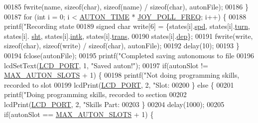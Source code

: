 \begin{DoxyCode}
{{{{{{{{{{{{{{{{{00185         fwrite(name, \textcolor{keyword}{sizeof}(\textcolor{keywordtype}{char}), \textcolor{keyword}{sizeof}(name) / \textcolor{keyword}{sizeof}(\textcolor{keywordtype}{char}), autonFile);
00186     \}
00187     \textcolor{keywordflow}{for} (\textcolor{keywordtype}{int} i = 0; i < \hyperlink{autonrecorder_8h_aa19f7c427989a0a67f55958c610d0355}{AUTON\_TIME} * \hyperlink{autonrecorder_8h_a3d2260a30e7ce727bef0402edee4b205}{JOY\_POLL\_FREQ}; i++) \{
00188         printf(\textcolor{stringliteral}{"Recording state %
00189         \textcolor{keywordtype}{signed} \textcolor{keywordtype}{char} write[6] = \{states[i].\hyperlink{structjoy_state_a7867156ddb5bc22d57010c5af00c98af}{spd}, states[i].\hyperlink{structjoy_state_aacdbb758b97190220423402f63020483}{turn}, states[i].
      \hyperlink{structjoy_state_a751363be4e40b27bcbe558f41a15fe91}{sht}, states[i].\hyperlink{structjoy_state_a2314ed43be31ccc565381efd8398b921}{intk}, states[i].\hyperlink{structjoy_state_acc4f7bae078e8c8b7840cda61382c7cf}{trans},
00190                                 states[i].\hyperlink{structjoy_state_a3ba5ee3c4eec0e2ee03338b397a17958}{dep}\};
00191         fwrite(write, \textcolor{keyword}{sizeof}(\textcolor{keywordtype}{char}), \textcolor{keyword}{sizeof}(write) / \textcolor{keyword}{sizeof}(\textcolor{keywordtype}{char}), autonFile);
00192         delay(10);
00193     \}
00194     fclose(autonFile);
00195     printf(\textcolor{stringliteral}{"Completed saving autonomous to file %
00196     lcdSetText(\hyperlink{lcdmsg_8h_abcf42bd88b3c36193f301ca25b033875}{LCD\_PORT}, 1, \textcolor{stringliteral}{"Saved auton!"});
00197     \textcolor{keywordflow}{if}(autonSlot != \hyperlink{autonrecorder_8h_a5173a11a545cb4020fdd139552dc15c1}{MAX\_AUTON\_SLOTS} + 1) \{
00198         printf(\textcolor{stringliteral}{"Not doing programming skills, recorded to slot %
00199         lcdPrint(\hyperlink{lcdmsg_8h_abcf42bd88b3c36193f301ca25b033875}{LCD\_PORT}, 2, \textcolor{stringliteral}{"Slot: %
00200     \} \textcolor{keywordflow}{else} \{
00201         printf(\textcolor{stringliteral}{"Doing programming skills, recorded to section %
00202         lcdPrint(\hyperlink{lcdmsg_8h_abcf42bd88b3c36193f301ca25b033875}{LCD\_PORT}, 2, \textcolor{stringliteral}{"Skills Part: %
00203     \}
00204     delay(1000);
00205     \textcolor{keywordflow}{if}(autonSlot == \hyperlink{autonrecorder_8h_a5173a11a545cb4020fdd139552dc15c1}{MAX\_AUTON\_SLOTS} + 1) \{
}}}}}}}}}}}}}}}}}}}}}}}
\end{DoxyCode}
